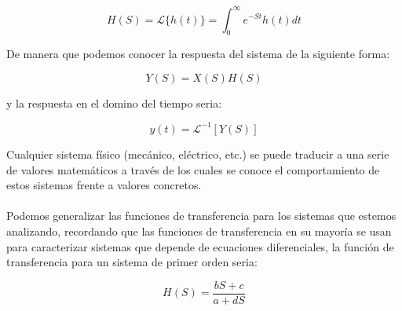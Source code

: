 \documentclass[12pt,a4paper]{article}
\begin{document}
	\begin{equation*}
		H(S) = \mathcal{L}  \{h(t)\} = \int_{0}^{\infty} e^{-St} h(t) dt
	\end{equation*}
	
	De manera que podemos conocer la respuesta del sistema de la siguiente forma:
	
	\begin{equation*}
		Y(S) = X(S)H(S)
	\end{equation*}
	
	y la respuesta en el domino del tiempo seria:
	
	\begin{equation*}
		y(t) = \mathcal{L}^{-1} [Y(S)]
	\end{equation*}
	
	Cualquier sistema físico (mecánico, eléctrico, etc.) se puede traducir a una serie de valores matemáticos a través de los cuales se conoce el comportamiento de estos sistemas frente a valores concretos.\\
	\\
	Podemos generalizar las funciones de transferencia para los sistemas que estemos analizando, recordando que las funciones de transferencia en su mayoría se usan para caracterizar sistemas que depende de ecuaciones diferenciales, la función de transferencia para un sistema de primer orden seria:
	
	\begin{equation*}
		H(S) = \frac{bS + c}{a + dS}
	\end{equation*}

\end{document}
